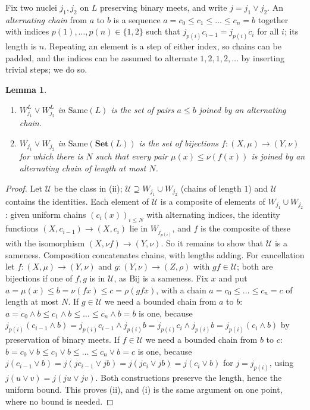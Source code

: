 \documentclass[11pt]{amsart}
\newtheorem{lem}[thm]{Lemma}
\theoremstyle{definition}
\newcommand{\Same}{\mathrm{Same}}
\newcommand{\FSet}{\mathbf{Set}}
\newcommand{\Bij}{\mathrm{Bij}}
\begin{document}
Fix two nuclei $j_1,j_2$ on $L$ preserving binary meets, and write
$j=j_1\vee j_2$. An \emph{alternating chain} from $a$ to $b$ is a sequence
$a=c_0\le c_1\le\dots\le c_n=b$ together with indices
$p(1),\dots,p(n)\in\{1,2\}$ such that $j_{p(i)}c_{i-1}=j_{p(i)}c_i$ for all
$i$; its length is $n$. Repeating an element is a step of either index, so
chains can be padded, and the indices can be assumed to alternate
$1,2,1,2,\dots$ by inserting trivial steps; we do so.

\begin{lem}\label{lem:chains}
\begin{enumerate}
\item[(i)] $W^L_{j_1}\vee W^L_{j_2}$ in $\Same(L)$ is the set of pairs $a\le b$
joined by an alternating chain.
\item[(ii)] $W_{j_1}\vee W_{j_2}$ in $\Same(\FSet(L))$ is the set of bijections
$f\colon(X,\mu)\to(Y,\nu)$ for which there is $N$ such that every pair
$\mu(x)\le\nu(f(x))$ is joined by an alternating chain of length at most $N$.
\end{enumerate}
\end{lem}
\begin{proof}
Let $\mathcal U$ be the class in (ii); $\mathcal U\supseteq W_{j_1}\cup W_{j_2}$
(chains of length $1$) and $\mathcal U$ contains the identities. Each
element of $\mathcal U$ is a composite of elements of $W_{j_1}\cup W_{j_2}$:
given uniform chains $(c_i(x))_{i\le N}$ with alternating indices, the
identity functions $(X,c_{i-1})\to(X,c_i)$ lie in $W_{j_{p(i)}}$, and
$f$ is the composite of these with the isomorphism $(X,\nu f)\to(Y,\nu)$.
So it remains to show that $\mathcal U$ is a sameness. Composition
concatenates chains, with lengths adding. For cancellation let
$f\colon(X,\mu)\to(Y,\nu)$ and $g\colon(Y,\nu)\to(Z,\rho)$ with
$gf\in\mathcal U$; both are bijections if one of $f,g$ is in $\mathcal U$,
as $\Bij$ is a sameness. Fix $x$ and put $a=\mu(x)\le b=\nu(fx)\le c=\rho(gfx)$,
with a chain $a=c_0\le\dots\le c_n=c$ of length at most $N$.
If $g\in\mathcal U$ we need a bounded chain from $a$ to $b$:
$a=c_0\wedge b\le c_1\wedge b\le\dots\le c_n\wedge b=b$ is one, because
$j_{p(i)}(c_{i-1}\wedge b)=j_{p(i)}c_{i-1}\wedge j_{p(i)}b=j_{p(i)}c_i\wedge
j_{p(i)}b=j_{p(i)}(c_i\wedge b)$ by preservation of binary meets. If
$f\in\mathcal U$ we need a bounded chain from $b$ to $c$:
$b=c_0\vee b\le c_1\vee b\le\dots\le c_n\vee b=c$ is one, because
$j(c_{i-1}\vee b)=j(jc_{i-1}\vee jb)=j(jc_i\vee jb)=j(c_i\vee b)$ for
$j=j_{p(i)}$, using $j(u\vee v)=j(ju\vee jv)$. Both constructions preserve
the length, hence the uniform bound. This proves (ii), and (i) is the same
argument on one point, where no bound is needed.
\end{proof}
\end{document}
